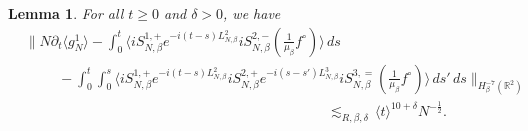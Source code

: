 \documentclass[a4paper,11pt,reqno,noindent]{amsart}
\theoremstyle{plain}
\newtheorem{lem}{Lemma}[section]
\numberwithin{equation}{section}
\newcommand{\R}{\mathbb R}
\newcommand{\3}{|\!|\!|}
\begin{document}
\begin{lem}\label{lem:exp-gn1-NG}
For all $t\ge0$ and $\delta>0$, we have
\begin{align*}
&\Big\|N\partial_t\langle g_N^1\rangle-\int_0^t\big\langle iS_{N,\beta}^{1,+}e^{-i(t-s)L_{N,\beta}^2} iS_{N,\beta}^{2,-}(\tfrac1{\mu_\beta}f^\circ)\big\rangle\,ds\\
&\hspace{1cm}-\int_0^t\!\!\int_0^s\big\langle iS_{N,\beta}^{1,+}e^{-i(t-s)L_{N,\beta}^2}iS_{N,\beta}^{2,+}e^{-i(s-s')L_{N,\beta}^3}iS_{N,\beta}^{3,=}(\tfrac1{\mu_\beta}f^\circ)\big\rangle\,ds'\,ds\Big\|_{H^{-7}_\beta(\R^2)}\\
&\hspace{9cm}\,\lesssim_{R,\beta,\delta}\,\langle t\rangle^{10+\delta} N^{-\frac12}.
\end{align*}
\end{lem}
\end{document}
